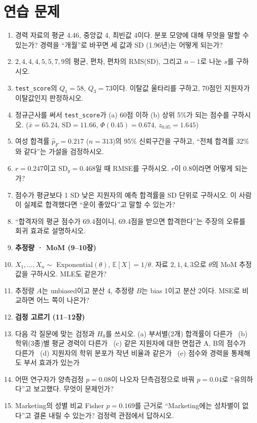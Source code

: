 \documentclass[11pt,a4paper]{article}
\newcommand{\E}{\mathbb{E}}
\newcommand{\SD}{\mathrm{SD}}
\newcommand{\code}[1]{\texttt{#1}}
\begin{document}
\section{연습 문제}
\begin{enumerate}
\item 경력 자료의 평균 4.46, 중앙값 4, 최빈값 4이다. 분포 모양에 대해 무엇을 말할 수 있는가? 경력을 ``개월''로 바꾸면 세 값과 SD (1.96년)는 어떻게 되는가?
\item $2, 4, 4, 4, 5, 5, 7, 9$의 평균, 편차, 편차의 RMS(SD), 그리고 $n-1$로 나눈 $s$를 구하시오.
\item \code{test\_score}의 $Q_1=58$, $Q_3=73$이다. 이탈값 울타리를 구하고, 70점인 지원자가 이탈값인지 판정하시오.
\item 정규근사를 써서 \code{test\_score}가 (a) 60점 이하 (b) 상위 5\%가 되는 점수를 구하시오. ($\bar x=65.24$, $\SD=11.66$, $\Phi(0.45)=0.674$, $z_{0.05}=1.645$)
\item 여성 합격률 $\hat p_F=0.217$ ($n=313$)의 95\% 신뢰구간을 구하고, ``전체 합격률 32\%와 같다''는 가설을 검정하시오.
\item $r=0.247$이고 $\SD_y=0.468$일 때 RMSE를 구하시오. $r$이 0.8이라면 어떻게 되는가?
\item 점수가 평균보다 1 SD 낮은 지원자의 예측 합격률을 SD 단위로 구하시오. 이 사람이 실제로 합격했다면 ``운이 좋았다''고 말할 수 있는가?
\item ``합격자의 평균 점수가 69.4점이니, 69.4점을 받으면 합격한다''는 주장의 오류를 회귀 효과로 설명하시오.
\item[] \textbf{추정량 · MoM (9–10장)}
\item $X_1,\dots,X_n\sim$ Exponential$(\theta)$, $\E[X]=1/\theta$. 자료 $2, 1, 4, 3$으로 $\theta$의 MoM 추정값을 구하시오. MLE도 같은가?
\item 추정량 $A$는 unbiased이고 분산 4, 추정량 $B$는 bias 1이고 분산 2이다. MSE로 비교하면 어느 쪽이 나은가?
\item[] \textbf{검정 고르기 (11–12장)}
\item 다음 각 질문에 맞는 검정과 $H_0$를 쓰시오.
 (a) 부서별(2개) 합격률이 다른가 \ (b) 학위(3종)별 평균 경력이 다른가 \ (c) 같은 지원자에 대한 면접관 A, B의 점수가 다른가 \ (d) 지원자의 학위 분포가 작년 비율과 같은가 \ (e) 점수와 경력을 통제해도 부서 효과가 있는가
\item 어떤 연구자가 양측검정 $p=0.08$이 나오자 단측검정으로 바꿔 $p=0.04$로 ``유의하다''고 보고했다. 무엇이 문제인가?
\item Marketing의 성별 비교 Fisher $p=0.169$를 근거로 ``Marketing에는 성차별이 없다''고 결론 내릴 수 있는가? 검정력 관점에서 답하시오.
\end{enumerate}
\end{document}
